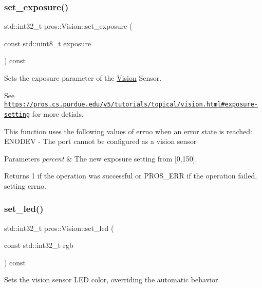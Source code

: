 \subsubsection{\texorpdfstring{set\+\_\+exposure()}{set\_exposure()}}
{\footnotesize\ttfamily std\+::int32\+\_\+t pros\+::\+Vision\+::set\+\_\+exposure (\begin{DoxyParamCaption}\item[{const std\+::uint8\+\_\+t}]{exposure }\end{DoxyParamCaption}) const}



Sets the exposure parameter of the \hyperlink{classpros_1_1Vision}{Vision} Sensor. 

See \href{https://pros.cs.purdue.edu/v5/tutorials/topical/vision.html#exposure-setting}{\tt https\+://pros.\+cs.\+purdue.\+edu/v5/tutorials/topical/vision.\+html\#exposure-\/setting} for more detials.

This function uses the following values of errno when an error state is reached\+: E\+N\+O\+D\+EV -\/ The port cannot be configured as a vision sensor


\begin{DoxyParams}{Parameters}
{\em percent} & The new exposure setting from \mbox{[}0,150\mbox{]}.\\
\hline
\end{DoxyParams}
\begin{DoxyReturn}{Returns}
1 if the operation was successful or P\+R\+O\+S\+\_\+\+E\+RR if the operation failed, setting errno. 
\end{DoxyReturn}
\mbox{\label{classpros_1_1Vision_ada3f1fdd2cc24c15af26bdd7c17bf604}} 
\subsubsection{\texorpdfstring{set\+\_\+led()}{set\_led()}}
{\footnotesize\ttfamily std\+::int32\+\_\+t pros\+::\+Vision\+::set\+\_\+led (\begin{DoxyParamCaption}\item[{const std\+::int32\+\_\+t}]{rgb }\end{DoxyParamCaption}) const}



Sets the vision sensor L\+ED color, overriding the automatic behavior. 

